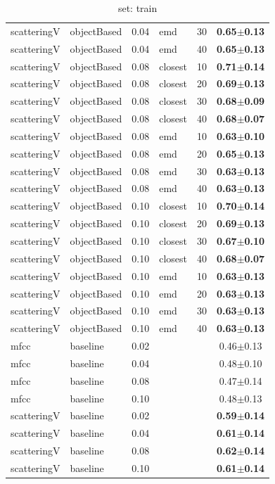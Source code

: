 \begin{table}
\begin{center}
\begin{tabular}{lllllc}
scatteringV & objectBased & 0.04 & emd & 30 & \textbf{0.65$\pm$0.13} \\ 
scatteringV & objectBased & 0.04 & emd & 40 & \textbf{0.65$\pm$0.13} \\ 
scatteringV & objectBased & 0.08 & closest & 10 & \textbf{0.71$\pm$0.14} \\ 
scatteringV & objectBased & 0.08 & closest & 20 & \textbf{0.69$\pm$0.13} \\ 
scatteringV & objectBased & 0.08 & closest & 30 & \textbf{0.68$\pm$0.09} \\ 
scatteringV & objectBased & 0.08 & closest & 40 & \textbf{0.68$\pm$0.07} \\ 
scatteringV & objectBased & 0.08 & emd & 10 & \textbf{0.63$\pm$0.10} \\ 
scatteringV & objectBased & 0.08 & emd & 20 & \textbf{0.65$\pm$0.13} \\ 
scatteringV & objectBased & 0.08 & emd & 30 & \textbf{0.63$\pm$0.13} \\ 
scatteringV & objectBased & 0.08 & emd & 40 & \textbf{0.63$\pm$0.13} \\ 
scatteringV & objectBased & 0.10 & closest & 10 & \textbf{0.70$\pm$0.14} \\ 
scatteringV & objectBased & 0.10 & closest & 20 & \textbf{0.69$\pm$0.13} \\ 
scatteringV & objectBased & 0.10 & closest & 30 & \textbf{0.67$\pm$0.10} \\ 
scatteringV & objectBased & 0.10 & closest & 40 & \textbf{0.68$\pm$0.07} \\ 
scatteringV & objectBased & 0.10 & emd & 10 & \textbf{0.63$\pm$0.13} \\ 
scatteringV & objectBased & 0.10 & emd & 20 & \textbf{0.63$\pm$0.13} \\ 
scatteringV & objectBased & 0.10 & emd & 30 & \textbf{0.63$\pm$0.13} \\ 
scatteringV & objectBased & 0.10 & emd & 40 & \textbf{0.63$\pm$0.13} \\ 
mfcc & baseline & 0.02 &  &  & 0.46$\pm$0.13 \\ 
mfcc & baseline & 0.04 &  &  & 0.48$\pm$0.10 \\ 
mfcc & baseline & 0.08 &  &  & 0.47$\pm$0.14 \\ 
mfcc & baseline & 0.10 &  &  & 0.48$\pm$0.13 \\ 
scatteringV & baseline & 0.02 &  &  & \textbf{0.59$\pm$0.14} \\ 
scatteringV & baseline & 0.04 &  &  & \textbf{0.61$\pm$0.14} \\ 
scatteringV & baseline & 0.08 &  &  & \textbf{0.62$\pm$0.14} \\ 
scatteringV & baseline & 0.10 &  &  & \textbf{0.61$\pm$0.14} \\ 
\end{tabular} 
\end{center} 
\caption{set: train} 
\label{settr} 
\end{table} 
 
